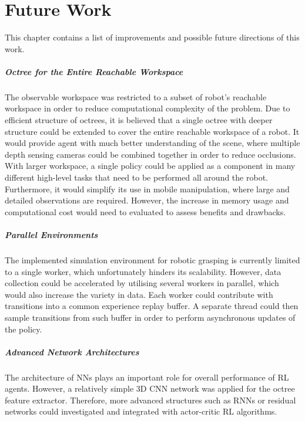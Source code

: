\chapter{Future Work}\label{ch:future_work}

This chapter contains a list of improvements and possible future directions of this work.

\paragraph{Octree for the Entire Reachable Workspace} The observable workspace was restricted to a subset of robot's reachable workspace in order to reduce computational complexity of the problem. Due to efficient structure of octrees, it is believed that a single octree with deeper structure could be extended to cover the entire reachable workspace of a robot. It would provide agent with much better understanding of the scene, where multiple depth sensing cameras could be combined together in order to reduce occlusions. With larger workspace, a single policy could be applied as a component in many different high-level tasks that need to be performed all around the robot. Furthermore, it would simplify its use in mobile manipulation, where large and detailed observations are required. However, the increase in memory usage and computational cost would need to evaluated to assess benefits and drawbacks.

\paragraph{Parallel Environments} The implemented simulation environment for robotic grasping is currently limited to a single worker, which unfortunately hinders its scalability. However, data collection could be accelerated by utilising several workers in parallel, which would also increase the variety in data. Each worker could contribute with transitions into a common experience replay buffer. A separate thread could then sample transitions from such buffer in order to perform asynchronous updates of the policy.

\paragraph{Advanced Network Architectures} The architecture of NNs plays an important role for overall performance of RL agents. However, a relatively simple 3D CNN network was applied for the octree feature extractor. Therefore, more advanced structures such as RNNs or residual networks could investigated and integrated with actor-critic RL algorithms.

